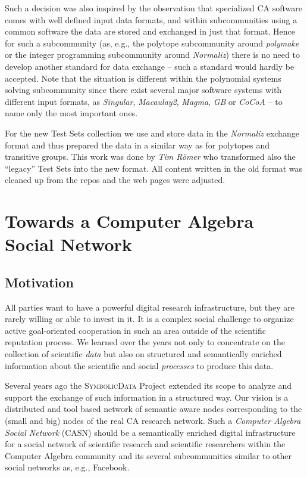 \documentclass[a4paper,11pt]{article}
\def\SD{\textsc{SymbolicData}}
\begin{document}
Such a decision was also inspired by the observation that specialized CA
software comes with well defined input data formats, and within subcommunities
using a common software the data are stored and exchanged in just that format.
Hence for such a subcommunity (as, e.g., the polytope subcommunity around
\emph{polymake} or the integer programming subcommunity around \emph{Normaliz})
there is no need to develop another standard for data exchange -- such a
standard would hardly be accepted.  Note that the situation is different
within the polynomial systems solving subcommunity since there exist several
major software systems with different input formats, as \emph{Singular},
\emph{Macaulay2}, \emph{Magma}, \emph{GB} or \emph{CoCoA} -- to name only the most important
ones.

For the new Test Sets collection we use and store data in the \emph{Normaliz}
exchange format and thus prepared the data in a similar way as for polytopes
and transitive groups. This work was done by \emph{Tim R\"omer} who
transformed also the ``legacy'' Test Sets into the new format.  All
content written in
the old format was cleaned up from the repos and the web pages were adjusted.

\section{Towards a Computer Algebra Social Network}

\subsection{Motivation}

All parties want to have a powerful digital research infrastructure,
but they are rarely willing or able to invest in it.  It is a complex social
challenge to organize active goal-oriented cooperation in such an area outside
of the scientific reputation process. We learned over the years not only to
concentrate on the collection of scientific \emph{data} but also on structured
and semantically enriched information about the scientific and social
\emph{processes} to produce this data.  

Several years ago the {\SD} Project extended its scope to analyze and support
the exchange of such information in a structured way.  Our vision is a
distributed and tool based network of semantic aware nodes corresponding to the
(small and big) nodes of the real CA research network.  Such a \emph{Computer
  Algebra Social Network} (CASN) should be a semantically enriched digital
infrastructure for a social network of scientific research and scientific
researchers within the Computer Algebra community and its several subcommunities
similar to other social networks as, e.g., Facebook.  
\end{document}

